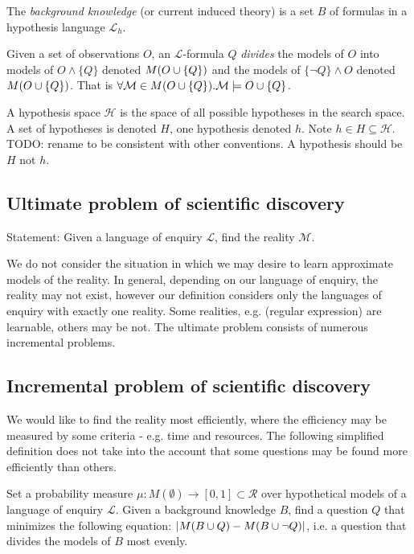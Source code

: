 \begin{defn}
The \emph{background knowledge} (or current induced theory) is a set $B$ of formulas in a hypothesis language $\mathcal{L}_h$.
\end{defn}

\begin{note}
Given a set of observations $O$, an $\mathcal{L}$-formula $Q$ \emph{divides} the models of $O$ into models of $O \wedge \{Q\}$ denoted $M(O \cup \{Q\})$ and the models of $\{\neg Q\} \wedge O$ denoted $M(O \cup \{Q\})$. That is $\forall \mathcal{M} \in M(O \cup \{Q\}). \mathcal{M} \models O \cup \{Q\}$.
\end{note}

\begin{defn}
A hypothesis space $\mathcal{H}$ is the space of all possible hypotheses in the search space. A set of hypotheses is denoted $H$, one hypothesis denoted $h$. Note $h \in H \subseteq \mathcal{H}$.
TODO: rename to be consistent with other conventions. A hypothesis should be $H$ not $h$.
\end{defn}

\subsection{Ultimate problem of scientific discovery}
Statement: Given a language of enquiry $\mathcal{L}$, find the reality $\mathcal{M}$.

We do not consider the situation in which we may desire to learn approximate models of the reality. In general, depending on our language of enquiry, the reality may not exist, however our definition considers only the languages of enquiry with exactly one reality. Some realities, e.g. (regular expression) are learnable, others may be not. The ultimate problem consists of numerous incremental problems.

\subsection{Incremental problem of scientific discovery}
We would like to find the reality most efficiently, where the efficiency may be measured by some criteria - e.g. time and resources. The following simplified definition does not take into the account that some questions may be found more efficiently than others.

Set a probability measure $\mu:M(\emptyset) \to [0,1] \subset \mathcal{R}$ over hypothetical models of a language of enquiry $\mathcal{L}$. Given a background knowledge $B$, find a question $Q$ that minimizes the following equation: $|M(B \cup {Q})-M(B \cup {\neg Q})|$, i.e. a question that divides the models of $B$ most evenly.


